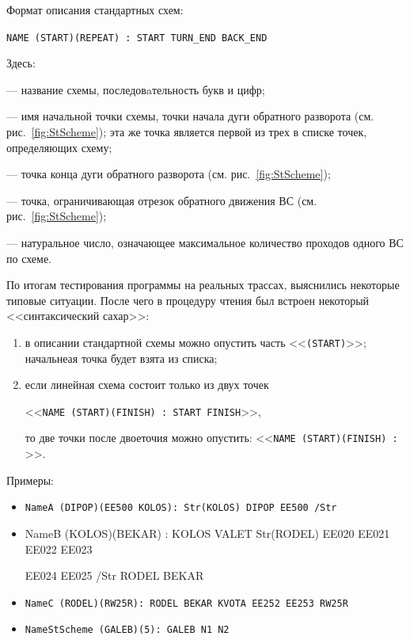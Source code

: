 \documentclass[12pt]{article}
\theoremstyle{plain}
\begin{document}
Формат описания стандартных схем:
\begin{center}
  \verb|NAME (START)(REPEAT) : START TURN_END BACK_END|
\end{center}
Здесь:
\begin{description}[topsep=-0.5\parsep,itemsep=-0.5\parsep]
  \item[\texttt{NAME}] --- название схемы, последовaтельность букв и цифр; 
  \item[\texttt{START}] --- имя начальной точки схемы, точки начала дуги обратного разворота (см. рис.~\ref{fig:StScheme}); эта же точка является первой из трех в списке точек, определяющих схему;
  \item[\texttt{TURN\_END}] --- точка конца дуги обратного разворота  (см. рис.~\ref{fig:StScheme});
  \item[\texttt{BACK\_END}] --- точка, ограничивающая отрезок обратного движения ВС  (см. рис.~\ref{fig:StScheme});
  \item[\texttt{REPEAT}] --- натуральное число, означающее максимальное количество проходов одного ВС по схеме.
\end{description}

\medskip

По итогам тестирования программы на реальных трассах, выяснились некоторые типовые ситуации. После чего в процедуру чтения был встроен некоторый <<синтаксический сахар>>:
\begin{enumerate}[topsep=-0.5\parsep,itemsep=-0.5\parsep]
  \item в описании стандартной схемы можно опустить часть <<\texttt{(START)}>>; начальнеая точка будет взята из списка;
  \item если линейная схема состоит только из двух точек 

  \centerline{<<\texttt{NAME (START)(FINISH) : START FINISH}>>,} 

  то две точки после двоеточия можно опустить: <<\texttt{NAME (START)(FINISH) : }>>.
\end{enumerate}

\medskip

Примеры:
\begin{itemize}
  \item \texttt{NameA (DIPOP)(EE500 KOLOS): Str(KOLOS) DIPOP EE500 /Str}
  \item {\ttfamily NameB (KOLOS)(BEKAR) : KOLOS VALET Str(RODEL) EE020 EE021 EE022 EE023

  EE024 EE025 /Str RODEL BEKAR}

  \item \texttt{NameС (RODEL)(RW25R): RODEL BEKAR KVOTA EE252 EE253 RW25R}
  \item \texttt{NameStScheme (GALEB)(5): GALEB N1 N2}
\end{itemize}
\end{document}
